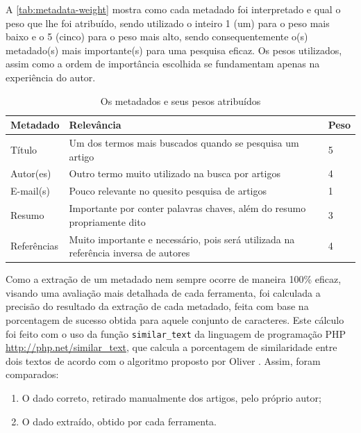 A \autoref{tab:metadata-weight} mostra como cada metadado foi interpretado e qual o peso que lhe foi atribuído, sendo utilizado o inteiro 1 (um) para o peso mais baixo e o 5 (cinco) para o peso mais alto, sendo consequentemente o(s) metadado(s) mais importante(s) para uma pesquisa eficaz. Os pesos utilizados, assim como a ordem de importância escolhida se fundamentam apenas na experiência do autor.


\begin{table}[h!]
    \caption{Os metadados e seus pesos atribuídos}
    \begin{center}
        \begin{tabular}{|p{3cm}|p{8cm}|C{1cm}|}
            \hline \textbf{Metadado} & \textbf{Relevância} & \textbf{Peso} \\ 
            \hline Título & Um dos termos mais buscados quando se pesquisa um artigo & 5 \\
            \hline Autor(es) & Outro termo muito utilizado na busca por artigos & 4 \\
            \hline E-mail(s) & Pouco relevante no quesito pesquisa de artigos & 1 \\
            \hline Resumo & Importante por conter palavras chaves, além do resumo propriamente dito & 3 \\
            \hline Referências & Muito importante e necessário, pois será utilizada na referência inversa de autores & 4 \\
            \hline 
        \end{tabular} 
    \end{center}
    \label{tab:metadata-weight}
\end{table}

Como a extração de um metadado nem sempre ocorre de maneira 100\% eficaz, visando uma avaliação mais detalhada de cada ferramenta, foi calculada a precisão do resultado da extração de cada metadado, feita com base na porcentagem de sucesso obtida para aquele conjunto de caracteres. Este cálculo foi feito com o uso da função \texttt{similar\_text} da linguagem de programação PHP \url{http://php.net/similar_text}, que calcula a porcentagem de similaridade entre dois textos de acordo com o algoritmo proposto por Oliver \cite{oliver-1993}. Assim, foram comparados:

\begin{enumerate}
    \item O dado correto, retirado manualmente dos artigos, pelo próprio autor;
    \item O dado extraído, obtido por cada ferramenta.
\end{enumerate}

